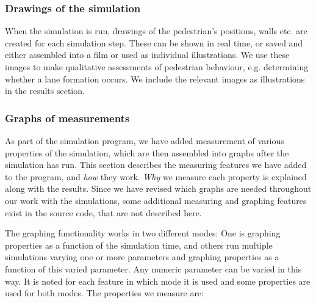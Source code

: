 \subsubsection{Drawings of the simulation}
When the simulation is run, drawings of the pedestrian's positions, walls etc. are 
created for each simulation step. These can be shown in real time, or saved 
and either assembled into a film or used as individual illustrations. We use 
these images to make qualitative assessments of pedestrian behaviour, e.g. 
determining whether a lane formation occurs. We include the relevant images as 
illustrations in the results section.

\subsubsection{Graphs of measurements}
As part of the simulation program, we have added measurement of various 
properties of the simulation, which are then assembled into graphs after the 
simulation has run. This section describes the measuring features we have 
added to the program, and \emph{how} they work. \emph{Why} we measure each 
property is explained along with the results. Since we have revised which 
graphs are needed throughout our work with the simulations, some additional 
measuring and graphing features exist in the source code, that are not 
described here.


The graphing functionality works in two different modes: One is graphing 
properties as a function of the simulation time, and others run multiple 
simulations varying one or more parameters and graphing properties as a 
function of this varied parameter. Any numeric parameter can be varied in this 
way. It is noted for each feature in which mode it is used and some properties 
are used for both modes. The properties we measure are:

